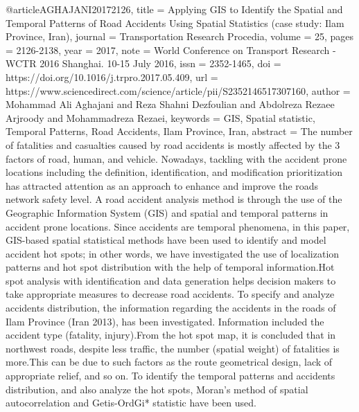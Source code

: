 @article{AGHAJANI20172126,
title = {Applying GIS to Identify the Spatial and Temporal Patterns of Road Accidents Using Spatial Statistics (case study: Ilam Province, Iran)},
journal = {Transportation Research Procedia},
volume = {25},
pages = {2126-2138},
year = {2017},
note = {World Conference on Transport Research - WCTR 2016 Shanghai. 10-15 July 2016},
issn = {2352-1465},
doi = {https://doi.org/10.1016/j.trpro.2017.05.409},
url = {https://www.sciencedirect.com/science/article/pii/S2352146517307160},
author = {Mohammad Ali Aghajani and Reza Shahni Dezfoulian and Abdolreza Rezaee Arjroody and Mohammadreza Rezaei},
keywords = {GIS, Spatial statistic, Temporal Patterns, Road Accidents, Ilam Province, Iran},
abstract = {The number of fatalities and casualties caused by road accidents is mostly affected by the 3 factors of road, human, and vehicle. Nowadays, tackling with the accident prone locations including the definition, identification, and modification prioritization has attracted attention as an approach to enhance and improve the roads network safety level. A road accident analysis method is through the use of the Geographic Information System (GIS) and spatial and temporal patterns in accident prone locations. Since accidents are temporal phenomena, in this paper, GIS-based spatial statistical methods have been used to identify and model accident hot spots; in other words, we have investigated the use of localization patterns and hot spot distribution with the help of temporal information.Hot spot analysis with identification and data generation helps decision makers to take appropriate measures to decrease road accidents. To specify and analyze accidents distribution, the information regarding the accidents in the roads of Ilam Province (Iran 2013), has been investigated. Information included the accident type (fatality, injury).From the hot spot map, it is concluded that in northwest roads, despite less traffic, the number (spatial weight) of fatalities is more.This can be due to such factors as the route geometrical design, lack of appropriate relief, and so on. To identify the temporal patterns and accidents distribution, and also analyze the hot spots, Moran's method of spatial autocorrelation and Getis-OrdGi* statistic have been used.}
}